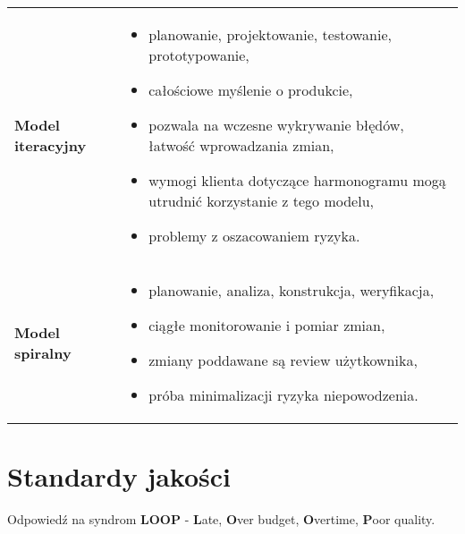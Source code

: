 \documentclass[a4paper]{article}
\begin{document}
\begin{table}[H]
\begin{center}
\begin{tabular}{ p{4cm} p{11cm}  }
                \cmidrule(r){1-1}\cmidrule(l){2-2}

                \textbf{Model iteracyjny}
                &
                \begin{itemize}
                    \item planowanie, projektowanie, testowanie, prototypowanie,
                    \item całościowe myślenie o produkcie,
                    \item pozwala na wczesne wykrywanie błędów, łatwość wprowadzania zmian,
                    \item wymogi klienta dotyczące harmonogramu mogą utrudnić korzystanie z tego
                    modelu,
                    \item problemy z oszacowaniem ryzyka.
                \end{itemize}
                \\

                \cmidrule(r){1-1}\cmidrule(l){2-2}

                \textbf{Model spiralny}
                &
                \begin{itemize}
                    \item planowanie, analiza, konstrukcja, weryfikacja,
                    \item ciągłe monitorowanie i pomiar zmian,
                    \item zmiany poddawane są review użytkownika,
                    \item próba minimalizacji ryzyka niepowodzenia.
                \end{itemize}
                \\

            \end{tabular}
        \end{center}
    \end{table}


    \section{Standardy jakości}

    Odpowiedź na syndrom \textbf{LOOP} - \textbf{L}ate, \textbf{O}ver budget, \textbf{O}vertime, \textbf{P}oor quality.
\end{document}
